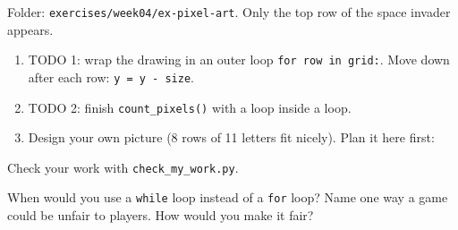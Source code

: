 \begin{exercise}
Folder: \texttt{exercises/week04/ex-pixel-art}. Only the top row of the space invader appears.
\begin{enumerate}[leftmargin=1.4em]
  \item TODO 1: wrap the drawing in an outer loop \texttt{for row in grid:}. Move down after each row: \texttt{y = y - size}.
  \item TODO 2: finish \texttt{count\_pixels()} with a loop inside a loop.
  \item Design your own picture (8 rows of 11 letters fit nicely). Plan it here first:
\end{enumerate}
\begin{center}
\end{center}
Check your work with \texttt{check\_my\_work.py}.
\end{exercise}

\begin{vocab}
\end{vocab}

\begin{reflection}
When would you use a \texttt{while} loop instead of a \texttt{for} loop?
Name one way a game could be unfair to players. How would you make it fair?
\end{reflection}
